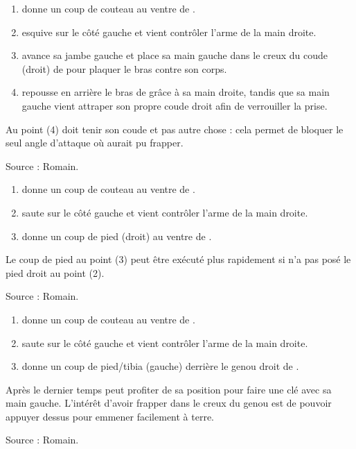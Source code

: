 \begin{technique}

\begin{enumerate}
	\item \A donne un coup de couteau au ventre de \D.
	
	\item \D esquive sur le côté gauche et vient contrôler l'arme de la main droite.
	
	\item \D avance sa jambe gauche et place sa main gauche dans le creux du coude (droit) de \A pour plaquer le bras contre son corps.
	
	\item \D repousse en arrière le bras de \A grâce à sa main droite, tandis que sa main gauche vient attraper son propre coude droit afin de verrouiller la prise.
\end{enumerate}

Au point (4) \D doit tenir son coude et pas autre chose : cela permet de bloquer le seul angle d'attaque où \A aurait pu frapper.

Source : Romain.

\end{technique}


\begin{technique}

\begin{enumerate}
	\item \A donne un coup de couteau au ventre de \D.
	
	\item \D saute sur le côté gauche et vient contrôler l'arme de la main droite.
	
	\item \D donne un coup de pied (droit) au ventre de \A.
\end{enumerate}

Le coup de pied au point (3) peut être exécuté plus rapidement si \D n'a pas posé le pied droit au point (2).

Source : Romain.

\end{technique}


\begin{technique}

\begin{enumerate}
	\item \A donne un coup de couteau au ventre de \D.
	
	\item \D saute sur le côté gauche et vient contrôler l'arme de la main droite.
	
	\item \D donne un coup de pied/tibia (gauche) derrière le genou droit de \A.
\end{enumerate}

Après le dernier temps \D peut profiter de sa position pour faire une clé avec sa main gauche.
L'intérêt d'avoir frapper dans le creux du genou est de pouvoir appuyer dessus pour emmener facilement \A à terre.

Source : Romain.

\end{technique}


